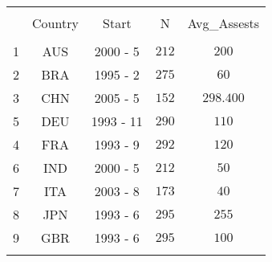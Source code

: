 
\begin{table}[!htbp] \centering 
  \caption{} 
  \label{} 
\begin{tabular}{@{\extracolsep{5pt}} Hcccc} 
\\[-1.8ex]\hline 
\hline \\[-1.8ex] 
 & Country & Start & N & Avg\_Assests \\ 
\hline \\[-1.8ex] 
1 & AUS & 2000 - 5 & $212$ & $200$ \\ 
2 & BRA & 1995 - 2 & $275$ & $60$ \\ 
3 & CHN & 2005 - 5 & $152$ & $298.400$ \\ 
5 & DEU & 1993 - 11 & $290$ & $110$ \\
4 & FRA & 1993 - 9 & $292$ & $120$ \\ 
6 & IND & 2000 - 5 & $212$ & $50$ \\ 
7 & ITA & 2003 - 8 & $173$ & $40$ \\ 
8 & JPN & 1993 - 6 & $295$ & $255$ \\ 
9 & GBR & 1993 - 6 & $295$ & $100$ \\ 
\hline \\[-1.8ex] 
\end{tabular} 
\end{table} 
